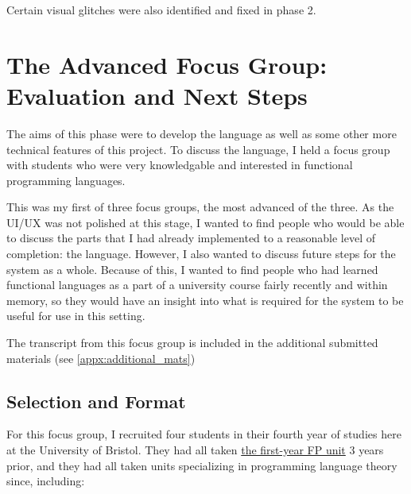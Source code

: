 Certain visual glitches were also identified and fixed in phase 2. 

\section{The Advanced Focus Group: Evaluation and Next Steps}
\label{ref:afg_figma}
\label{ref:afg}
The aims of this phase were to develop the language as well as some other more technical features of this project. To discuss the language, I held a focus group with students who were very knowledgable and interested in functional programming languages. 

This was my first of three focus groups, the most advanced of the three. As the UI/UX was not polished at this stage, I wanted to find people who would be able to discuss the parts that I had already implemented to a reasonable level of completion: the language. However, I also wanted to discuss future steps for the system as a whole. Because of this, I wanted to find people who had learned functional languages as a part of a university course fairly recently and within memory, so they would have an insight into what is required for the system to be useful for use in this setting. 

The transcript from this focus group is included in the additional submitted materials (see \ref{appx:additional_mats})

\subsection{Selection and Format}

For this focus group, I recruited four students in their fourth year of studies here at the University of Bristol. They had all taken \hyperref[COMS10016]{the first-year FP unit} 3 years prior, and they had all taken units specializing in programming language theory since, including:

